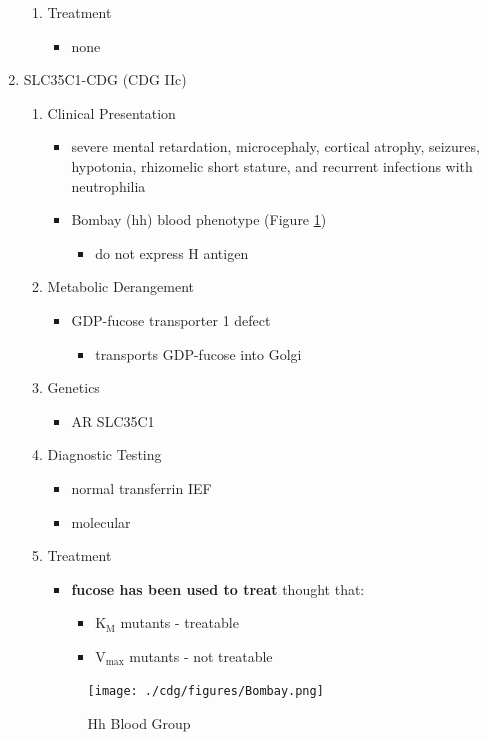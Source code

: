 \documentclass{scrartcl}
\begin{document}
\begin{enumerate}
\begin{enumerate}
\item Treatment
\label{sec:orgbdd8dbd}
\begin{itemize}
\item none
\end{itemize}
\end{enumerate}
\item SLC35C1-CDG (CDG IIc)
\label{sec:org76222be}
\begin{enumerate}
\item Clinical Presentation
\label{sec:org6c8ae30}
\begin{itemize}
\item severe mental retardation, microcephaly, cortical atrophy, seizures,
hypotonia, rhizomelic short stature, and recurrent infections with
neutrophilia
\item Bombay (hh) blood phenotype (Figure \ref{fig:org3e63623})
\begin{itemize}
\item do not express H antigen
\end{itemize}
\end{itemize}
\item Metabolic Derangement
\label{sec:orgd49b821}
\begin{itemize}
\item GDP-fucose transporter 1 defect
\begin{itemize}
\item transports GDP-fucose into Golgi
\end{itemize}
\end{itemize}
\item Genetics
\label{sec:orge200a69}
\begin{itemize}
\item AR SLC35C1
\end{itemize}

\item Diagnostic Testing
\label{sec:org6cf37b6}
\begin{itemize}
\item normal transferrin IEF
\item molecular
\end{itemize}
\item Treatment
\label{sec:org470d902}
\begin{itemize}
\item \textbf{fucose has been used to treat} thought that:
\begin{itemize}
\item K\(_{\text{M}}\) mutants - treatable
\item V\(_{\text{max}}\) mutants - not treatable
\end{itemize}
\end{itemize}

\begin{figure}[htbp]
\centering
\texttt{[image: ./cdg/figures/Bombay.png]}
\caption[Hh]{\label{fig:org3e63623}
Hh Blood Group}
\end{figure}
\end{enumerate}
\end{enumerate}
\end{document}
